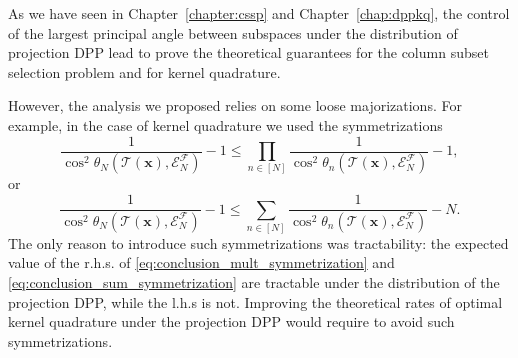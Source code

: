 \documentclass[twoside,11pt]{book}
\numberwithin{theorem}{chapter}
\numberwithin{definition}{chapter}
\numberwithin{proposition}{chapter}
\numberwithin{corollary}{chapter}
\numberwithin{example}{chapter}
\numberwithin{lemma}{chapter}
\numberwithin{assumption}{chapter}
\numberwithin{equation}{chapter}
\numberwithin{figure}{chapter}
\begin{document}
As we have seen in Chapter~\ref{chapter:cssp} and Chapter~\ref{chap:dppkq}, the control of the largest principal angle between subspaces under the distribution of projection DPP lead to prove the theoretical guarantees for the column subset selection problem and for kernel quadrature. 

However, the analysis we proposed relies on some loose majorizations.
For example, in the case of kernel quadrature we used the symmetrizations
\begin{equation}\label{eq:conclusion_mult_symmetrization}
\frac{1}{\cos^{2} \theta_{N}(\mathcal{T}(\bm{x}),\mathcal{E}^{\mathcal{F}}_{N})} - 1 \leq \prod\limits_{n \in [N]}\frac{1}{\cos^{2} \theta_{n}(\mathcal{T}(\bm{x}),\mathcal{E}^{\mathcal{F}}_{N})} -1, 
\end{equation}
or
\begin{equation}\label{eq:conclusion_sum_symmetrization}
\frac{1}{\cos^{2} \theta_{N}(\mathcal{T}(\bm{x}),\mathcal{E}^{\mathcal{F}}_{N})} - 1 \leq \sum\limits_{n \in [N]}\frac{1}{\cos^{2} \theta_{n}(\mathcal{T}(\bm{x}),\mathcal{E}^{\mathcal{F}}_{N})} -N. 
\end{equation}
The only reason to introduce such symmetrizations was tractability: 
the expected value of the r.h.s. of \eqref{eq:conclusion_mult_symmetrization} and \eqref{eq:conclusion_sum_symmetrization} are tractable under the distribution of the projection DPP, while the l.h.s is not. Improving the theoretical rates of optimal kernel quadrature under the projection DPP would require to avoid such symmetrizations.
\end{document}
